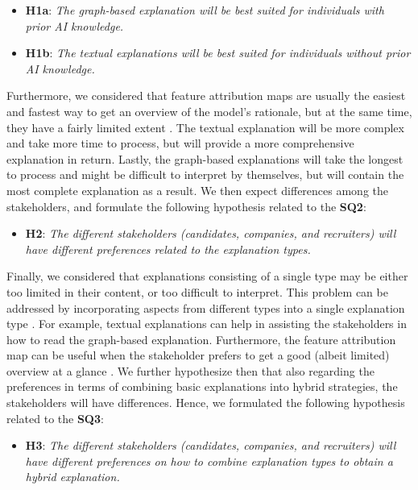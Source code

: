 \begin{itemize}
    \item \textbf{H1a}: \textit{The graph-based explanation will be best suited for individuals with prior AI knowledge.}
    \item \textbf{H1b}: \textit{The textual explanations will be best suited for individuals without prior AI knowledge.}    
\end{itemize}

Furthermore, we considered that feature attribution maps are usually the easiest and fastest way to get an overview of the model's rationale, but at the same time, they have a fairly limited extent \cite{szymanski2021visual}. The textual explanation will be more complex and take more time to process, but will provide a more comprehensive explanation in return. Lastly, the graph-based explanations will take the longest to process and might be difficult to interpret by themselves, but will contain the most complete explanation as a result. We then expect differences among the stakeholders, and formulate the following hypothesis related to the \textbf{SQ2}:

\begin{itemize}
    \item \textbf{H2}: \textit{The different stakeholders (candidates, companies, and recruiters) will have different preferences related to the explanation types.}   
\end{itemize}

Finally, we considered that explanations consisting of a single type may be either too limited in their content, or too difficult to interpret. This problem can be addressed by incorporating aspects from different types into a single explanation type \cite{szymanski2021visual}. For example, textual explanations can help in assisting the stakeholders in how to read the graph-based explanation. Furthermore, the feature attribution map can be useful when the stakeholder prefers to get a good (albeit limited) overview at a glance \cite{schellingerhout2022explainable}. We further hypothesize then that also regarding the preferences in terms of combining basic explanations into hybrid strategies, the stakeholders will have differences. Hence, we formulated the following hypothesis related to the \textbf{SQ3}:

\begin{itemize}
    \item \textbf{H3}: \textit{The different stakeholders (candidates, companies, and recruiters) will have different preferences on how to combine explanation types to obtain a hybrid explanation.}

\end{itemize}



